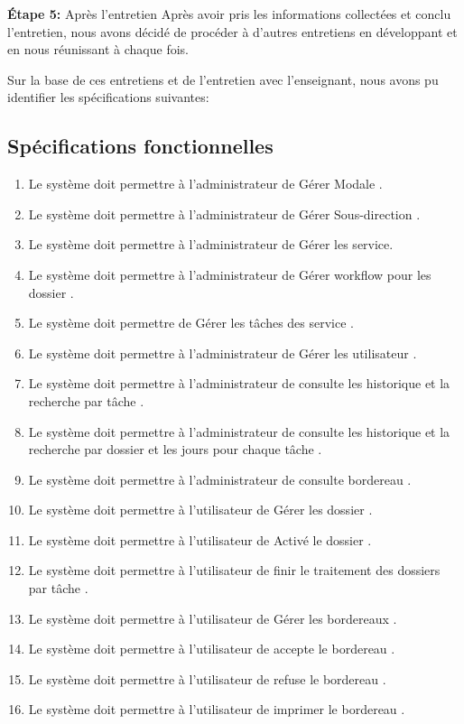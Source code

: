 \textbf{ Étape 5:} Après l'entretien Après avoir pris les informations collectées et conclu l'entretien, nous avons décidé de procéder à d'autres entretiens en développant et en nous réunissant à chaque fois.
 
 
 Sur la base de ces entretiens et de l'entretien avec l'enseignant, nous avons pu identifier les spécifications suivantes:
 
 \subsection{Spécifications fonctionnelles }
 
 \begin{enumerate}
\item  	   Le système doit permettre à l’administrateur  de  Gérer Modale .
\item  	   Le système doit permettre à l’administrateur  de  Gérer Sous-direction .
\item  	   Le système doit permettre à l’administrateur  de Gérer les service.
\item  	   Le système doit permettre à l’administrateur  de Gérer workflow pour les dossier  .
\item  	   Le système doit permettre de  Gérer les tâches des service . 
\item  	   Le système doit permettre à l’administrateur  de Gérer les utilisateur .
\item  	   Le système doit permettre à l’administrateur  de  consulte les historique  et la recherche par tâche .
\item  	   Le système doit permettre à l’administrateur  de  consulte les historique  et la recherche par dossier et les jours pour chaque tâche .
\item  	   Le système doit permettre à l’administrateur  de  consulte bordereau .
\item  	   Le système doit permettre à l’utilisateur   de  Gérer les dossier .
\item  	   Le système doit permettre à l’utilisateur   de  Activé le dossier    .
\item  	   Le système doit permettre à l’utilisateur   de  finir le traitement des dossiers par tâche    .
\item  	   Le système doit permettre à l’utilisateur   de  Gérer les  bordereaux  .
\item  	   Le système doit permettre à l’utilisateur   de  accepte le  bordereau  .
\item  	   Le système doit permettre à l’utilisateur   de  refuse  le  bordereau  .
\item  	   Le système doit permettre à l’utilisateur   de  imprimer le  bordereau  .

 \end{enumerate}
 
